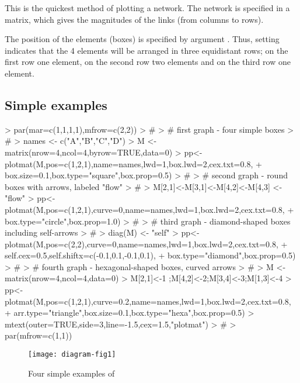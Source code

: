 \documentclass[article,nojss]{jss}
\begin{document}
This is the quickest method of plotting a network. The network is specified in
a matrix, which gives the magnitudes of the links (from columns to rows).

The position of the elements (boxes) is specified by argument .
Thus, setting  indicates that the 4 elements will be arranged
in three equidistant rows; on the first row one element, on the second row two elements
and on the third row one element.

\subsection{Simple examples}
\begin{Schunk}
\begin{Sinput}
> par(mar=c(1,1,1,1),mfrow=c(2,2))
> #
> # first graph - four simple boxes
> #
> names <- c("A","B","C","D")
> M <- matrix(nrow=4,ncol=4,byrow=TRUE,data=0)
> pp<-plotmat(M,pos=c(1,2,1),name=names,lwd=1,box.lwd=2,cex.txt=0.8,
+             box.size=0.1,box.type="square",box.prop=0.5)
> #
> # second graph - round boxes with arrows, labeled "flow"
> #
> M[2,1]<-M[3,1]<-M[4,2]<-M[4,3] <- "flow"
> pp<-plotmat(M,pos=c(1,2,1),curve=0,name=names,lwd=1,box.lwd=2,cex.txt=0.8,
+             box.type="circle",box.prop=1.0)
> #
> # third graph - diamond-shaped boxes including self-arrows
> #
> diag(M) <- "self"
> pp<-plotmat(M,pos=c(2,2),curve=0,name=names,lwd=1,box.lwd=2,cex.txt=0.8,
+             self.cex=0.5,self.shiftx=c(-0.1,0.1,-0.1,0.1),
+             box.type="diamond",box.prop=0.5)
> #
> # fourth graph - hexagonal-shaped boxes, curved arrows
> #
> M <- matrix(nrow=4,ncol=4,data=0)
> M[2,1]<-1  ;M[4,2]<-2;M[3,4]<-3;M[1,3]<-4
> pp<-plotmat(M,pos=c(1,2,1),curve=0.2,name=names,lwd=1,box.lwd=2,cex.txt=0.8,
+             arr.type="triangle",box.size=0.1,box.type="hexa",box.prop=0.5)
> mtext(outer=TRUE,side=3,line=-1.5,cex=1.5,"plotmat")
> #
> par(mfrow=c(1,1))
\end{Sinput}
\end{Schunk}
\begin{figure}
\begin{center}
\texttt{[image: diagram-fig1]}
\end{center}
\caption{Four simple examples of }
\label{fig:one}
\end{figure}
\end{document}
